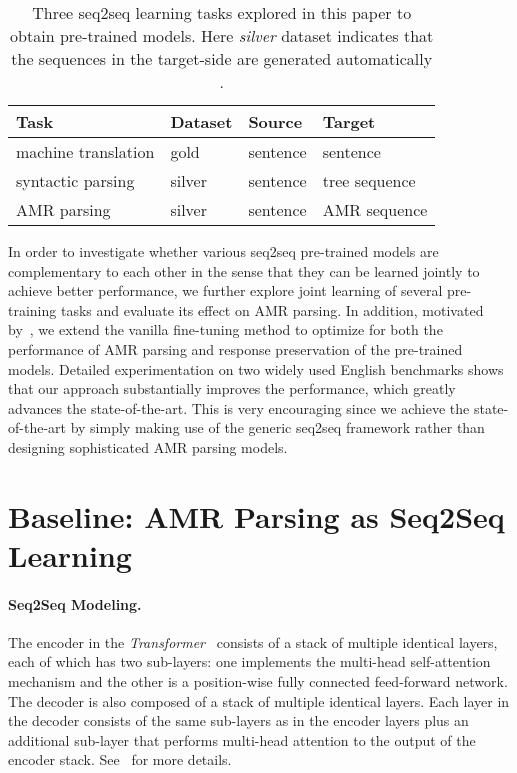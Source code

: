 \documentclass[11pt,a4paper]{article}
\begin{document}
\begin{table}[]
\setlength{\tabcolsep}{3pt}
    \small
    \centering
    \begin{tabular}{l|lll}
    \hline
         \bf Task & \bf Dataset & \bf Source & \bf Target  \\
    \hline
        machine translation & gold & sentence & sentence\\ 
        syntactic parsing  & silver & sentence & tree sequence \\ 
        AMR parsing  & silver & sentence & AMR sequence\\
    \hline
    \end{tabular}
    \caption{Three seq2seq learning tasks explored in this paper to obtain pre-trained models. Here \textit{silver} dataset indicates that the sequences in the target-side are generated automatically .}
    \label{tbl:tasks}
\end{table}

In order to investigate whether various seq2seq pre-trained models are complementary to each other in the sense that they can be learned jointly to achieve better performance, we further explore joint learning of several pre-training tasks and evaluate its effect on AMR parsing. In addition, motivated by~\citet{li_hoiem_pami_2018}, we extend the vanilla fine-tuning method to optimize for both the performance of AMR parsing and response preservation of the pre-trained models. Detailed experimentation on two widely used English benchmarks shows that our approach substantially improves the performance, which greatly advances the state-of-the-art. This is very encouraging since we achieve the state-of-the-art by simply making use of the generic seq2seq framework rather than designing sophisticated AMR parsing models.

\section{Baseline: AMR Parsing as Seq2Seq Learning}
\paragraph{Seq2Seq Modeling.} The encoder in the {\em Transformer}~\cite{vaswani_etal_nips_2017} consists of a stack of multiple identical layers, each of which has two sub-layers: one implements the multi-head self-attention mechanism and the other is a position-wise fully connected feed-forward network. The decoder is also composed of a stack of multiple identical layers. Each layer in the decoder consists of the same sub-layers as in the encoder layers plus an additional sub-layer that performs multi-head attention to the output of the encoder stack. See~\citet{vaswani_etal_nips_2017} for more details.
\end{document}
